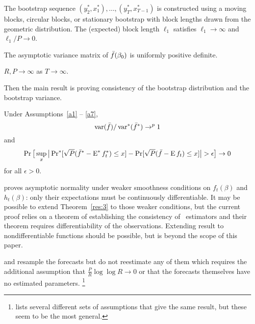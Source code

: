 \documentclass[12pt,fleqn]{article}
\begin{document}
\begin{asmp}\label{a4}
  The bootstrap sequence $(y_2^*, x_1^*),\dots,(y_T^*, x_{T-1}^*)$ is
  constructed using a moving blocks, circular blocks, or stationary
  bootstrap with block lengths drawn from the geometric distribution.
  The (expected) block length $\ell_1$ satisfies $\ell_1 \to \infty$
  and $\ell_1/P \to 0$.
\end{asmp}

\begin{asmp}\label{a6}
  The asymptotic variance matrix of $\bar{f}(\beta_0)$ is uniformly
  positive definite.
\end{asmp}

\begin{asmp}\label{a7}
  $R, P \to \infty$ as $T \to \infty$.
\end{asmp}

Then the main result is proving consistency of the bootstrap
distribution and the bootstrap variance.

\begin{thm}\label{res:3}
  Under Assumptions~\ref{a1} -- \ref{a7},
  \begin{equation}\label{eq:14}
    \operatorname{var}(\bar f)/\operatorname{var}^*(\bar f^*) \to^p 1
  \end{equation}
  and
  \begin{equation}\label{eq:15}
    \operatorname{Pr}\big[\sup_x \big\lvert \operatorname{Pr}^*[\sqrt{P} (\bar f^* - \operatorname{E}^* f_t^*) \leq x]
    - \operatorname{Pr}[\sqrt{P}( \bar{f} - \operatorname{E} f_t) \leq x] \big\rvert > \epsilon\big] \to 0
  \end{equation}
  for all $\epsilon > 0$.
\end{thm}

\begin{rem}
  \citet{Mcc:00} proves asymptotic normality under weaker smoothness
  conditions on $f_t(\beta)$ and $h_t(\beta)$: only their expectations
  must be continuously differentiable.  It may be possible to extend
  Theorem~\ref{res:3} to those weaker conditions, but the current
  proof relies on a theorem of  establishing the
  consistency of \hac\ estimators and their theorem requires differentiability of
  the observations.  Extending  result to
  nondifferentiable functions should be possible, but is beyond the
  scope of this paper.
\end{rem}

\begin{rem}
  \citet{Whi:00} and \citet{Han:05} resample the forecasts but do not
  reestimate any of them which requires the additional assumption that
  $\tfrac{P}{R} \log \log R \to 0$ or that the forecasts themselves
  have no estimated parameters.%
\footnote{\citet{Whi:00} lists several
    different sets of assumptions that give the same result, but these
    seem to be the most general.} %
\end{rem}
\end{document}
